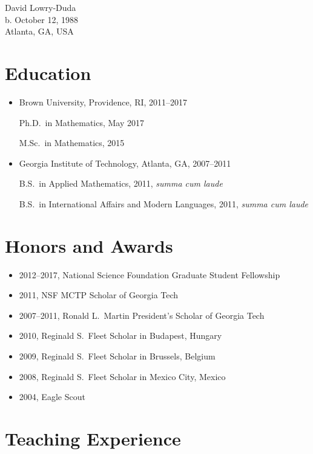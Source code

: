 
\begin{center}
David Lowry-Duda \\
b. October 12, 1988 \\
Atlanta, GA, USA
\end{center}


\section*{Education}

\begin{itemize}

  \item Brown University, Providence, RI, 2011--2017

    Ph.D.\ in Mathematics, May 2017

    M.Sc.\ in Mathematics, 2015

  \item Georgia Institute of Technology, Atlanta, GA, 2007--2011

    B.S.\ in Applied Mathematics, 2011, \emph{summa cum laude}

    B.S.\ in International Affairs and Modern Languages, 2011, \emph{summa cum laude}

  \end{itemize}


\section*{Honors and Awards}


\begin{itemize}

  \item 2012--2017, National Science Foundation Graduate Student Fellowship
  \item 2011, NSF MCTP Scholar of Georgia Tech
  \item 2007--2011, Ronald L.\ Martin President's Scholar of Georgia Tech
  \item 2010, Reginald S.\ Fleet Scholar in Budapest, Hungary
  \item 2009, Reginald S.\ Fleet Scholar in Brussels, Belgium
  \item 2008, Reginald S.\ Fleet Scholar in Mexico City, Mexico
  \item 2004, Eagle Scout

\end{itemize}


\section*{Teaching Experience}

